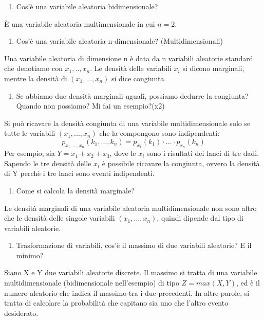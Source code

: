 \begin{enumerate}[resume]\bfseries
\item Cos'è una variabile aleatoria bidimensionale?
\end{enumerate}
È una variabile aleatoria multimensionale in cui $n=2$.
\begin{enumerate}[resume]\bfseries
\item Cos'è una variabile aleatoria n-dimensionale? (Multidimensionali)
\end{enumerate}
Una variabile aleatoria di dimensione n è data da n variabili aleatorie standard che denotiamo con $x_1,..,x_n$.
Le densità delle variabili $x_i$ si dicono marginali, mentre la densità di $(x_1,...,x_n)$ si dice congiunta.
\begin{enumerate}[resume]\bfseries
	\item Se abbiamo due densità marginali uguali, possiamo dedurre la congiunta? Quando non possiamo? Mi fai un esempio?(x2)
\end{enumerate}
Si può ricavare la densità congiunta di una variabile multidimensionale solo se tutte le variabili $(x_1,...,x_n)$ che la compongono sono indipendenti:
\[p_{x_1,...,x_n}(k_1,...,k_n)= p_{x_1}(k_1)  \cdot ...  \cdot p_{x_n}(k_n) \]
Per esempio, sia $Y = x_1 + x_2 + x_3$, dove le $x_i$ sono i risultati dei lanci di tre dadi. Sapendo le tre densità delle $x_i$ è possibile ricavare la congiunta, ovvero la densità di Y perchè i tre lanci sono eventi indipendenti.
\begin{enumerate}[resume]\bfseries
	\item Come si calcola la densità marginale?
\end{enumerate}
Le densità marginali di una variabile aleatoria multidimensionale non sono altro che le densità delle singole variabili $(x_1,...,x_n)$, quindi dipende dal tipo di variabili aleatorie.
\begin{enumerate}[resume]\bfseries
	\item Trasformazione di variabili, cos'è il massimo di due variabili aleatorie? E il minimo?
\end{enumerate}
Siano X e Y due variabili aleatorie discrete.\newline
Il massimo si tratta di una variabile multidimensionale (bidimensionale nell'esempio) di tipo $Z=max(X,Y)$, ed è il numero aleatorio che indica il massimo tra i due precedenti.\newline
In altre parole, si tratta di calcolare la probabilità che capitano sia uno che l'altro evento desiderato.\newline
